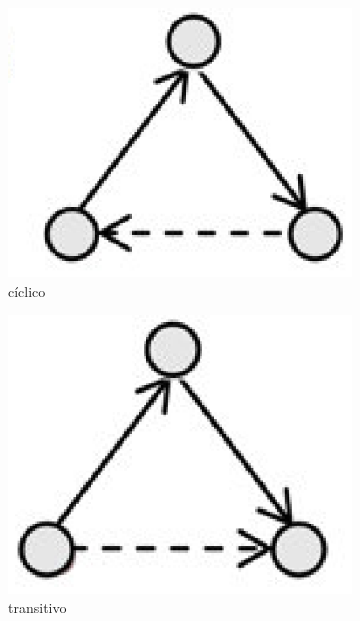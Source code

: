\begin{figure}
	\begin{subfigure}{.25\textwidth}
  		\centering
  		\includegraphics[width=.9\linewidth]{figuras/opfecho_a.eps}
  		\caption{cíclico}
  		\label{fig:subop1}
	\end{subfigure}%
		\begin{subfigure}{.25\textwidth}
  		\centering
  		\includegraphics[width=.9\linewidth]{figuras/opfecho_b.eps}
  		\caption{transitivo}
  		\label{fig:subop2}
	\end{subfigure}%
		\begin{subfigure}{.25\textwidth}
  		\centering

\end{subfigure}
\end{figure}
